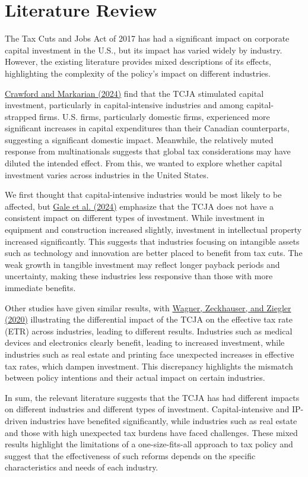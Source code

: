 \documentclass[11pt]{article}
\begin{document}
\section{Literature Review}
The Tax Cuts and Jobs Act of 2017 has had a significant impact on corporate capital investment in the U.S., but its impact has varied widely by industry. However, the existing literature provides mixed descriptions of its effects, highlighting the complexity of the policy's impact on different industries.

\hyperref[crawford]{Crawford and Markarian (2024)} find that the TCJA stimulated capital investment, particularly in capital-intensive industries and among capital-strapped firms. U.S. firms, particularly domestic firms, experienced more significant increases in capital expenditures than their Canadian counterparts, suggesting a significant domestic impact. Meanwhile, the relatively muted response from multinationals suggests that global tax considerations may have diluted the intended effect. From this, we wanted to explore whether capital investment varies across industries in the United States.

We first thought that capital-intensive industries would be most likely to be affected, but \hyperref[gale]{Gale et al. (2024)} emphasize that the TCJA does not have a consistent impact on different types of investment. While investment in equipment and construction increased slightly, investment in intellectual property increased significantly. This suggests that industries focusing on intangible assets such as technology and innovation are better placed to benefit from tax cuts. The weak growth in tangible investment may reflect longer payback periods and uncertainty, making these industries less responsive than those with more immediate benefits.

Other studies have given similar results, with \hyperref[wagner]{Wagner, Zeckhauser, and Ziegler (2020)} illustrating the differential impact of the TCJA on the effective tax rate (ETR) across industries, leading to different results. Industries such as medical devices and electronics clearly benefit, leading to increased investment, while industries such as real estate and printing face unexpected increases in effective tax rates, which dampen investment. This discrepancy highlights the mismatch between policy intentions and their actual impact on certain industries.

In sum, the relevant literature suggests that the TCJA has had different impacts on different industries and different types of investment. Capital-intensive and IP-driven industries have benefited significantly, while industries such as real estate and those with high unexpected tax burdens have faced challenges. These mixed results highlight the limitations of a one-size-fits-all approach to tax policy and suggest that the effectiveness of such reforms depends on the specific characteristics and needs of each industry.
\end{document}
